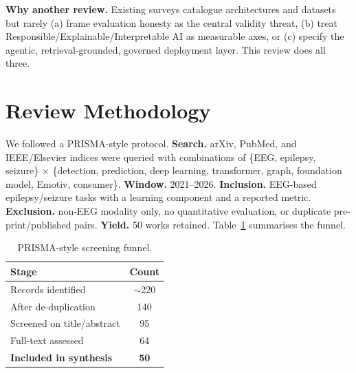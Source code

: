 \documentclass[10pt,journal,twocolumn]{IEEEtran}
\begin{document}
\textbf{Why another review.} Existing surveys catalogue architectures and datasets but rarely (a) frame evaluation honesty as the central validity threat, (b) treat Responsible/Explainable/Interpretable AI as measurable axes, or (c) specify the agentic, retrieval-grounded, governed deployment layer. This review does all three.

\section{Review Methodology}
We followed a PRISMA-style protocol. \textbf{Search.} arXiv, PubMed, and IEEE/Elsevier indices were queried with combinations of \{EEG, epilepsy, seizure\} $\times$ \{detection, prediction, deep learning, transformer, graph, foundation model, Emotiv, consumer\}. \textbf{Window.} 2021--2026. \textbf{Inclusion.} EEG-based epilepsy/seizure tasks with a learning component and a reported metric. \textbf{Exclusion.} non-EEG modality only, no quantitative evaluation, or duplicate pre-print/published pairs. \textbf{Yield.} 50 works retained. Table~\ref{tab:prisma} summarises the funnel.
\begin{table}[h]\centering\caption{PRISMA-style screening funnel.}\label{tab:prisma}
\begin{tabular}{lc}\toprule
Stage & Count\\\midrule
Records identified & $\sim$220\\
After de-duplication & 140\\
Screened on title/abstract & 95\\
Full-text assessed & 64\\
\textbf{Included in synthesis} & \textbf{50}\\\bottomrule
\end{tabular}\end{table}





\end{document}
